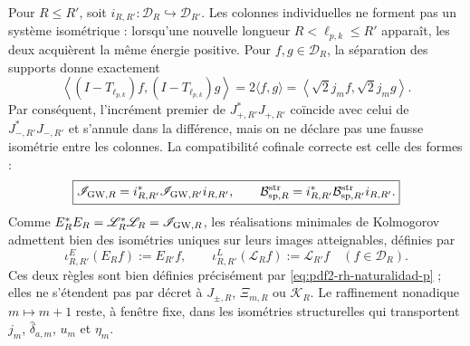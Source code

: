 Pour \(R\leq R'\), soit
\(i_{R,R'}:\mathcal D_R\hookrightarrow\mathcal D_{R'}\). Les colonnes
individuelles ne forment pas un système isométrique : lorsqu'une nouvelle longueur
\(R<\ell_{p,k}\leq R'\) apparaît, les deux acquièrent la même énergie positive. Pour
\(f,g\in\mathcal D_R\), la séparation des supports donne exactement
\begin{equation}\label{eq:pdf2-rh-naturalidad}
 \left\langle(I-T_{\ell_{p,k}})f,
                    (I-T_{\ell_{p,k}})g\right\rangle
 =2\langle f,g\rangle
 =\left\langle\sqrt2j_mf,\sqrt2j_mg\right\rangle .
\end{equation}
Par conséquent, l'incrément premier de
\(J_{+,R'}^*J_{+,R'}\) coïncide avec celui de
\(J_{-,R'}^*J_{-,R'}\) et s'annule dans la différence, mais on ne déclare pas une
fausse isométrie entre les colonnes. La compatibilité cofinale correcte est celle
des formes :
\begin{equation}\label{eq:pdf2-rh-naturalidad-p}
 \boxed{
 \mathscr I_{{\rm GW},R}
 =i_{R,R'}^*\mathscr I_{{\rm GW},R'}i_{R,R'},
 \qquad
 \mathcal B_{{\rm sp},R}^{\rm str}
 =i_{R,R'}^*\mathcal B_{{\rm sp},R'}^{\rm str}i_{R,R'}.}
\end{equation}
Comme \(E_R^*E_R=\mathscr L_R^*\mathscr L_R=\mathscr I_{{\rm GW},R}\), les
réalisations minimales de Kolmogorov admettent bien des isométries uniques sur leurs
images atteignables, définies par
\begin{equation}\label{eq:pdf2-rh-naturalidad-bw}
 \iota_{R,R'}^E(E_Rf):=E_{R'}f,
 \qquad
 \iota_{R,R'}^L(\mathscr L_Rf):=\mathscr L_{R'}f
 \quad(f\in\mathcal D_R).
\end{equation}
Ces deux règles sont bien définies précisément par
\eqref{eq:pdf2-rh-naturalidad-p} ; elles ne s'étendent pas par décret à
\(J_{\pm,R}\), \(\Xi_{m,R}\) ou \(\mathcal K_R\). Le raffinement nonadique
\(m\mapsto m+1\) reste, à fenêtre fixe, dans les isométries structurelles
qui transportent \(j_m\), \(\widehat\delta_{a,m}\), \(u_m\) et \(\eta_m\).

